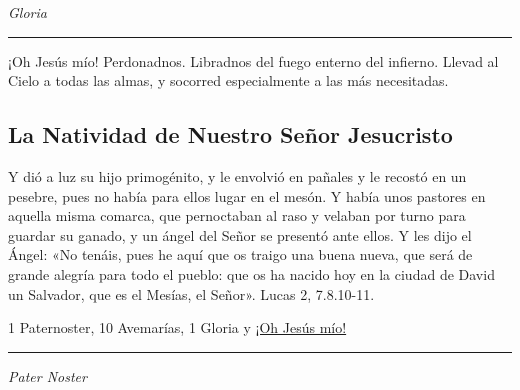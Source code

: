 \documentclass[a4paper,11pt, oneside]{report}
\begin{document}
\indent\textit{Gloria}

\begin{center}\rule{1\linewidth}{\linethickness}\end{center}

\hypertarget{finalVisitacion}{¡Oh Jesús mío! Perdonadnos. Libradnos del fuego enterno del infierno. Llevad al Cielo a todas las almas, y socorred especialmente a las más 
necesitadas.}
  
                      
\subsection*{La Natividad de Nuestro Señor Jesucristo}

Y dió a luz su hijo primogénito, y le envolvió en pañales y le recostó en un pesebre, pues no había para ellos lugar en el mesón. Y había unos pastores 
en aquella misma comarca, que pernoctaban al raso y velaban por turno para guardar su ganado, y un ángel del Señor se presentó ante ellos. Y les dijo el Ángel: 
«No tenáis, pues he aquí que os traigo una buena nueva, que será de grande alegría para todo el pueblo: que os ha nacido hoy en la ciudad de David
un Salvador, que es el Mesías, el Señor». Lucas 2, 7.8.10-11.

\medskip

1 Paternoster, 10 Avemarías, 1 Gloria y \hyperlink{finalNatividad}{¡Oh Jesús mío!}

\medskip

\begin{center}\rule{1\linewidth}{\linethickness}\end{center}

\medskip
\textit{Pater Noster} 
\end{document}
